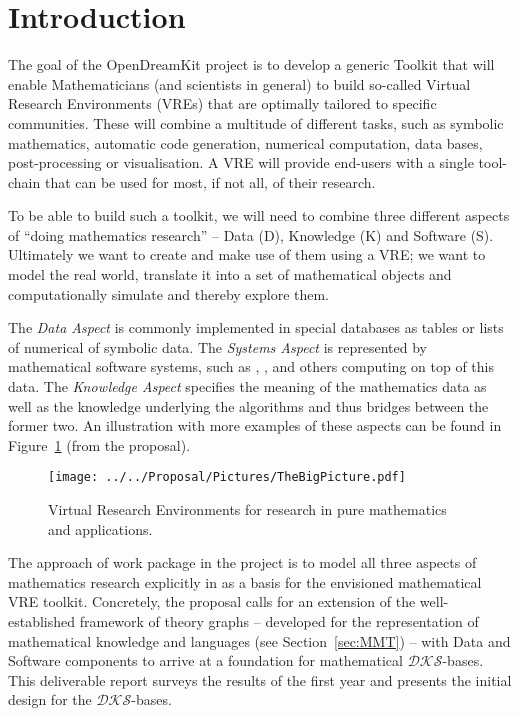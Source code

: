 \section{Introduction}\label{sec:intro}

The goal of the OpenDreamKit project \cite{ODKproposal:on} is to develop a generic Toolkit
that will enable Mathematicians (and scientists in general) to build so-called Virtual
Research Environments (VREs) that are optimally tailored to specific communities. These
will combine a multitude of different tasks, such as symbolic mathematics, automatic code
generation, numerical computation, data bases, post-processing or visualisation. A VRE
will provide end-users with a single tool-chain that can be used for most, if not all, of
their research.

To be able to build such a toolkit, we will need to combine three different aspects of
``doing mathematics research'' -- Data (D), Knowledge (K) and Software (S). Ultimately we want to
create and make use of them using a VRE; we want to model the real world, translate it
into a set of mathematical objects and computationally simulate and thereby explore them.

The \emph{Data Aspect} is commonly implemented in special databases as tables or lists of
numerical of symbolic data. The \emph{Systems Aspect} is represented by mathematical
software systems, such as \GAP, \SageMath, and others computing on top of this data. The
\emph{Knowledge Aspect} specifies the meaning of the mathematics data as well as the
knowledge underlying the algorithms and thus bridges between the former two. An
illustration with more examples of these aspects can be found in
Figure~\ref{fig:thebigpicture} (from the \pn proposal).

\begin{figure}[ht]\centering
  \texttt{[image: ../../Proposal/Pictures/TheBigPicture.pdf]}
  \caption{Virtual Research Environments for research in pure
    mathematics and applications.}
  \label{fig:thebigpicture}
\end{figure}

The approach of work package  in the \pn project is to model all three
aspects of mathematics research explicitly in as a basis for the envisioned mathematical
VRE toolkit. Concretely, the \pn proposal calls for an extension of the well-established
framework of theory graphs -- developed for the representation of mathematical knowledge
and languages (see Section~\ref{sec:MMT}) -- with Data and Software components to arrive
at a foundation for mathematical $\mathcal{DKS}$-bases. This deliverable report surveys
the results of the first year and presents the initial design for the
$\mathcal{DKS}$-bases.

